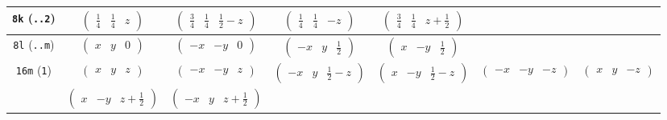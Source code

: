 \documentclass[fleqn,9pt,landscape]{jsarticle}
\begin{document}
\begin{center}
\begin{longtable}{ccccccc}
{\tt 8k} ({\tt ..2}) & $ \begin{pmatrix} \frac{1}{4} & \frac{1}{4} & z \end{pmatrix} $ & $ \begin{pmatrix} \frac{3}{4} & \frac{1}{4} & \frac{1}{2} - z \end{pmatrix} $ & $ \begin{pmatrix} \frac{1}{4} & \frac{1}{4} & - z \end{pmatrix} $ & $ \begin{pmatrix} \frac{3}{4} & \frac{1}{4} & z + \frac{1}{2} \end{pmatrix} $ & $  $ & $  $ \\ \hline
{\tt 8l} ({\tt ..m}) & $ \begin{pmatrix} x & y & 0 \end{pmatrix} $ & $ \begin{pmatrix} - x & - y & 0 \end{pmatrix} $ & $ \begin{pmatrix} - x & y & \frac{1}{2} \end{pmatrix} $ & $ \begin{pmatrix} x & - y & \frac{1}{2} \end{pmatrix} $ & $  $ & $  $ \\ \hline
{\tt 16m} ({\tt 1}) & $ \begin{pmatrix} x & y & z \end{pmatrix} $ & $ \begin{pmatrix} - x & - y & z \end{pmatrix} $ & $ \begin{pmatrix} - x & y & \frac{1}{2} - z \end{pmatrix} $ & $ \begin{pmatrix} x & - y & \frac{1}{2} - z \end{pmatrix} $ & $ \begin{pmatrix} - x & - y & - z \end{pmatrix} $ & $ \begin{pmatrix} x & y & - z \end{pmatrix} $ \\
& $ \begin{pmatrix} x & - y & z + \frac{1}{2} \end{pmatrix} $ & $ \begin{pmatrix} - x & y & z + \frac{1}{2} \end{pmatrix} $ & $  $ & $  $ & $  $ & $  $ \\
\end{longtable}
\end{center}
\end{document}
